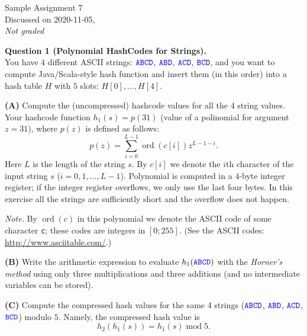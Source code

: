 \documentclass[a4paper,12pt]{article}
\begin{document}

\thispagestyle{empty}

\begin{center}
{\Large Sample Assignment 7}\\
{\Large Discussed on 2020-11-05,}\\
{\em Not graded} 
\end{center}

\noindent


\vspace{10pt}
{\bf Question 1 (Polynomial HashCodes for Strings).}\\
You have $4$ different ASCII strings: $\textcolor{blue}{\mathtt{ABCD}}$, 
$\textcolor{blue}{\mathtt{ABD}}$, 
$\textcolor{blue}{\mathtt{ACD}}$, 
$\textcolor{blue}{\mathtt{BCD}}$, and you want to compute 
Java/Scala-style hash function and insert them (in this order) into a
hash table $H$ with $5$ slots: $H[0],\ldots,H[4]$. 

{\bf (A)} Compute the (uncompressed) hashcode values for all the $4$ string values. 
Your hashcode function $h_1(s) = p(31)$ (value of a polinomial for argument $z = 31$), where
$p(z)$ is defined as follows:
$$p(z) = \sum\limits_{i=0}^{L-1} \operatorname{ord}(c[i]) z^{L-1-i}.$$
Here $L$ is the length of the string $s$.
By $c[i]$ we denote the $i$th character of the input string $s$
($i = 0,1,\ldots,L-1$). 
Polynomial is computed in a $4$-byte integer register; if the 
integer register overflows, we only use the last four bytes.  
In this exercise all the strings are sufficiently short and the overflow does not happen. 

{\em Note.} By $\operatorname{ord}(c)$ in this polynomial we denote
the ASCII code of some character {\tt c}; these codes are integers in $[0;255]$. 
(See the ASCII codes: \url{http://www.asciitable.com/}.) 

\vspace{10pt}
{\bf (B)} Write the arithmetic expression to evaluate $h_1(\textcolor{blue}{\mathtt{ABCD}})$ with the {\em Horner's method}
using only three multiplications and three additions (and no intermediate variables can be stored). 

\vspace{10pt}
{\bf (C)} Compute the compressed hash values for the same 4 strings
($\textcolor{blue}{\mathtt{ABCD}}$, 
$\textcolor{blue}{\mathtt{ABD}}$, 
$\textcolor{blue}{\mathtt{ACD}}$, 
$\textcolor{blue}{\mathtt{BCD}}$) modulo $5$. Namely, 
the compressed hash value is 
$$h_2(h_1(s)) = h_1(s)\;\text{mod}\;5.$$
\end{document}
